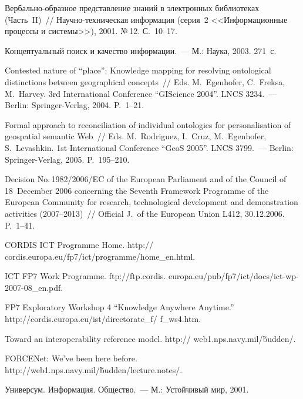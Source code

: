 \begin{multicols}{2}
{{\begin{thebibliography}{99}
Вербально-образное представление знаний в электронных библиотеках (Часть~II)~// 
Научно-техническая информация (серия~2 <<Информационные процессы и системы>>), 2001. №\,12.
С.~10--17.
{

}

Концептуальный поиск и качество информации.~--- М.: Наука, 2003.  271~с.

Contested nature of ``place'': Knowledge \mbox{mapping} for resolving ontological distinctions between
geo\-graphical concepts~// Eds. M.~Egenhofer, C.~Freksa, M.~Harvey. 3rd International
Conference ``GIScience 2004''. LNCS 3234.~--- Berlin: Springer-Verlag, 2004.  P.~1--21.

Formal approach to reconciliation of individual ontologies for personalisation of geospatial
semantic Web~// Eds. M.~Rodriguez, I.~Cruz, M.~Egenhofer, S.~Levashkin. 1st International
Conference ``GeoS 2005''. LNCS 3799.~--- Berlin: Springer-Verlag, 2005. P.~195--210.

Decision No.\,1982/2006/EC of the European Parliament and of the Council of 18~December 2006
concerning the Seventh Framework Programme of the European Community for research,
technological development and demonstration activities (2007--2013)~// Official J.\ of the
European Union L412, 30.12.2006.  P.~1--41.

CORDIS ICT Programme Home. {\sf http://} {\sf cordis.europa.eu/fp7/ict/programme/home\_en.html}.

ICT FP7 Work Programme.
{\sf ftp://ftp.cordis.} {\sf europa.eu/pub/fp7/ict/docs/ict-wp-2007-08\_en.pdf}.

FP7 Exploratory Workshop 4 ``Knowledge Anywhere Anytime.''
{\sf http://cordis.europa.eu/ist/directorate\_f/} {\sf f\_ws4.htm}.

Toward an interoperability reference model.
{\sf  http:// web1.nps.navy.mil/\~budden/}.

FORCENet: We've been here before. {\sf
http://web1.nps.navy.mil/\~budden/lecture.notes/}.

Универсум. Информация. Общество.~---  М.: Устойчивый мир, 2001.


\end{thebibliography}}}
\end{multicols}
